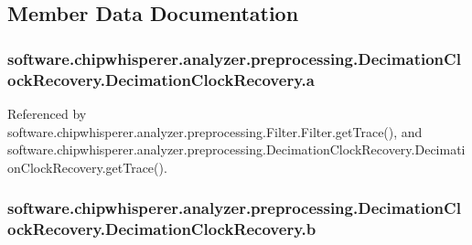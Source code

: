 \subsection{Member Data Documentation}
\hypertarget{classsoftware_1_1chipwhisperer_1_1analyzer_1_1preprocessing_1_1DecimationClockRecovery_1_1DecimationClockRecovery_ae37f2a4c14b74f697a34038afd39d632}{}
\subsubsection[{a}]{\setlength{\rightskip}{0pt plus 5cm}software.\+chipwhisperer.\+analyzer.\+preprocessing.\+Decimation\+Clock\+Recovery.\+Decimation\+Clock\+Recovery.\+a}\label{classsoftware_1_1chipwhisperer_1_1analyzer_1_1preprocessing_1_1DecimationClockRecovery_1_1DecimationClockRecovery_ae37f2a4c14b74f697a34038afd39d632}


Referenced by software.\+chipwhisperer.\+analyzer.\+preprocessing.\+Filter.\+Filter.\+get\+Trace(), and software.\+chipwhisperer.\+analyzer.\+preprocessing.\+Decimation\+Clock\+Recovery.\+Decimation\+Clock\+Recovery.\+get\+Trace().

\hypertarget{classsoftware_1_1chipwhisperer_1_1analyzer_1_1preprocessing_1_1DecimationClockRecovery_1_1DecimationClockRecovery_a6bd98870495dc0b2d3bc1a4f7f912e4d}{}
\subsubsection[{b}]{\setlength{\rightskip}{0pt plus 5cm}software.\+chipwhisperer.\+analyzer.\+preprocessing.\+Decimation\+Clock\+Recovery.\+Decimation\+Clock\+Recovery.\+b}\label{classsoftware_1_1chipwhisperer_1_1analyzer_1_1preprocessing_1_1DecimationClockRecovery_1_1DecimationClockRecovery_a6bd98870495dc0b2d3bc1a4f7f912e4d}


